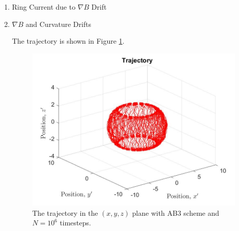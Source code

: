 \documentclass{article}
\begin{document}
\begin{enumerate}
\item Ring Current due to $\nabla B$ Drift


\item $\nabla B$ and Curvature Drifts

The trajectory is shown in Figure \ref{problem 4}.
\begin{figure}[h]
\centering
\vbox{
\includegraphics[scale=0.4]{problem4/trajectory.jpg}
}
\caption{The trajectory in the $(x, y, z)$ plane with AB3 scheme and $N=10^6 $ timesteps.}
\label{problem 4}
\end{figure}




\end{enumerate}
\end{document}
